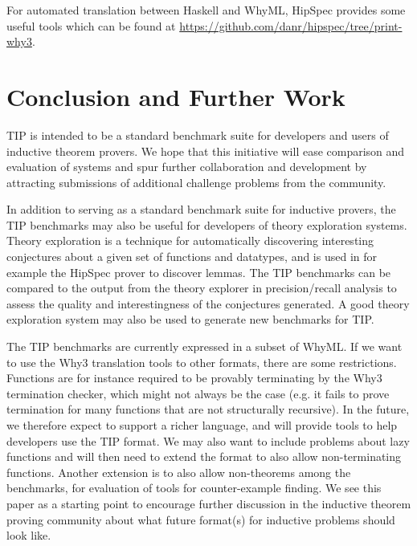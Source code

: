 \documentclass{llncs}
\begin{document}
For automated translation between Haskell and WhyML, HipSpec provides some useful tools which can be found at \url{https://github.com/danr/hipspec/tree/print-why3}.

\section{Conclusion and Further Work}
TIP is intended to be a standard benchmark suite for developers and users of inductive theorem provers. We hope that this initiative will ease comparison and evaluation of systems and spur further collaboration and development by attracting submissions of additional challenge problems from the community.

In addition to serving as a standard benchmark suite for inductive provers, the TIP benchmarks may also be useful for developers of theory exploration systems. Theory exploration is a technique for automatically discovering interesting conjectures about a given set of functions and datatypes, and is used in for example the HipSpec prover to discover lemmas. The TIP benchmarks can be compared to the output from the theory explorer in precision/recall analysis to assess the quality and interestingness of the conjectures generated. A good theory exploration system may also be used to generate new benchmarks for TIP.

The TIP benchmarks are currently expressed in a subset of WhyML. If we want to use the Why3 translation tools to other formats, there are some restrictions. Functions are for instance required to be provably terminating by the Why3 termination checker, which might not always be the case (e.g. it fails to prove termination for many functions that are not structurally recursive).
In the future, we therefore expect to support a richer language, and will provide tools to help developers use the TIP format.
We may also want to include problems about lazy functions and will then need to extend the format to also allow non-terminating functions.
Another extension is to also allow non-theorems among the benchmarks, for evaluation of tools for counter-example finding.  We see this paper as a starting point to encourage further discussion in the inductive theorem proving community about what future format(s) for inductive problems should look like.





\end{document}
